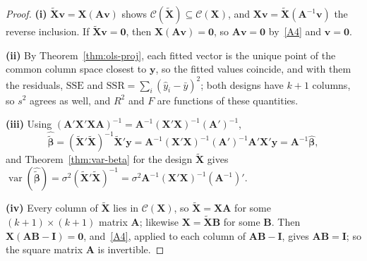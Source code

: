 \documentclass[14pt]{extarticle}
\theoremstyle{plain}
\theoremstyle{definition}
\theoremstyle{remark}
\DeclareMathOperator\var{var}
\newcommand{\SSR}{\mathrm{SSR}}
\newcommand{\SSE}{\mathrm{SSE}}
\newcommand{\bX}{\mathbf{X}}
\newcommand{\by}{\mathbf{y}}
\def\bb{\boldsymbol{\beta}}
\newcommand{\bI}{\mathbf{I}}
\newcommand{\bzero}{\mathbf{0}}
\newcommand{\bA}{\mathbf{A}}
\newcommand{\bv}{\mathbf{v}}
\newcommand{\calC}{\mathcal{C}}
\begin{document}
\begin{proof}
\textbf{(i)} $\tilde{\bX}\bv = \bX(\bA\bv)$ shows $\calC(\tilde{\bX}) \subseteq \calC(\bX)$, and $\bX\bv = \tilde{\bX}(\bA^{-1}\bv)$ the reverse inclusion. If $\tilde{\bX}\bv = \bzero$, then $\bX(\bA\bv) = \bzero$, so $\bA\bv = \bzero$ by~\ref{A4} and $\bv = \bzero$.

\textbf{(ii)} By Theorem~\ref{thm:ols-proj}, each fitted vector is the unique point of the common column space closest to $\by$, so the fitted values coincide, and with them the residuals, $\SSE$ and $\SSR = \sum_i(\hat y_i - \bar y)^2$; both designs have $k + 1$ columns, so $s^2$ agrees as well, and $R^2$ and $F$ are functions of these quantities.

\textbf{(iii)} Using $(\bA'\bX'\bX\bA)^{-1} = \bA^{-1}(\bX'\bX)^{-1}(\bA')^{-1}$,
\[
\hat{\tilde{\bb}} = (\tilde{\bX}'\tilde{\bX})^{-1}\tilde{\bX}'\by = \bA^{-1}(\bX'\bX)^{-1}(\bA')^{-1}\bA'\bX'\by = \bA^{-1}\hat{\bb},
\]
and Theorem~\ref{thm:var-beta} for the design $\tilde{\bX}$ gives $\var(\hat{\tilde{\bb}}) = \sigma^2(\tilde{\bX}'\tilde{\bX})^{-1} = \sigma^2\bA^{-1}(\bX'\bX)^{-1}(\bA^{-1})'$.

\textbf{(iv)} Every column of $\tilde{\bX}$ lies in $\calC(\bX)$, so $\tilde{\bX} = \bX\bA$ for some $(k+1) \times (k+1)$ matrix $\bA$; likewise $\bX = \tilde{\bX}\mathbf{B}$ for some $\mathbf{B}$. Then $\bX(\bA\mathbf{B} - \bI) = \bzero$, and~\ref{A4}, applied to each column of $\bA\mathbf{B} - \bI$, gives $\bA\mathbf{B} = \bI$; so the square matrix $\bA$ is invertible.
\end{proof}
\end{document}
